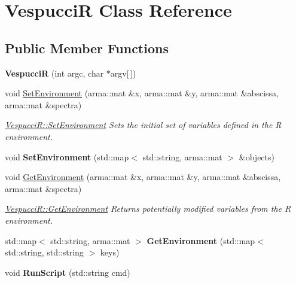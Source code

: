 \hypertarget{class_vespucci_r}{\section{Vespucci\+R Class Reference}
\label{class_vespucci_r}
}
\subsection*{Public Member Functions}
\begin{DoxyCompactItemize}
\item 
\hypertarget{class_vespucci_r_a12f725a7d70566345af1836a8d7ca8a3}{{\bfseries Vespucci\+R} (int argc, char $\ast$argv\mbox{[}$\,$\mbox{]})}\label{class_vespucci_r_a12f725a7d70566345af1836a8d7ca8a3}

\item 
void \hyperlink{class_vespucci_r_a22d8fc98c28bc09c0315a1a52ffe8ec2}{Set\+Environment} (arma\+::mat \&x, arma\+::mat \&y, arma\+::mat \&abscissa, arma\+::mat \&spectra)
\begin{DoxyCompactList}\small\item\em \hyperlink{class_vespucci_r_a22d8fc98c28bc09c0315a1a52ffe8ec2}{Vespucci\+R\+::\+Set\+Environment} Sets the initial set of variables defined in the R environment. \end{DoxyCompactList}\item 
\hypertarget{class_vespucci_r_a3d362aec993490166a1c4bfb74447fdd}{void {\bfseries Set\+Environment} (std\+::map$<$ std\+::string, arma\+::mat $>$ \&objects)}\label{class_vespucci_r_a3d362aec993490166a1c4bfb74447fdd}

\item 
void \hyperlink{class_vespucci_r_a05e5b3603d1c85508760951ed90b2737}{Get\+Environment} (arma\+::mat \&x, arma\+::mat \&y, arma\+::mat \&abscissa, arma\+::mat \&spectra)
\begin{DoxyCompactList}\small\item\em \hyperlink{class_vespucci_r_a05e5b3603d1c85508760951ed90b2737}{Vespucci\+R\+::\+Get\+Environment} Returns potentially modified variables from the R environment. \end{DoxyCompactList}\item 
\hypertarget{class_vespucci_r_a50a9a9a6349747c8587144f98a50d85b}{std\+::map$<$ std\+::string, arma\+::mat $>$ {\bfseries Get\+Environment} (std\+::map$<$ std\+::string, std\+::string $>$ keys)}\label{class_vespucci_r_a50a9a9a6349747c8587144f98a50d85b}

\item 
\hypertarget{class_vespucci_r_a520dfeee347527a033ef777b3fce11c8}{void {\bfseries Run\+Script} (std\+::string cmd)}\label{class_vespucci_r_a520dfeee347527a033ef777b3fce11c8}

\end{DoxyCompactItemize}


